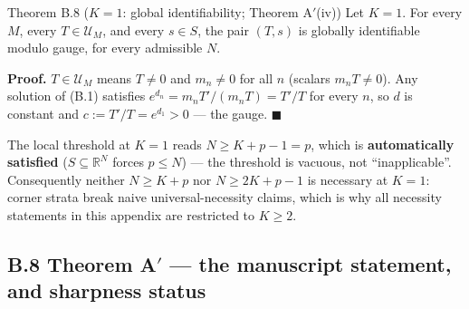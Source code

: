 \begin{namedthm}{Theorem B.8 ($K=1$: global identifiability; Theorem A$'$(iv))}
Let $K=1$. For every $M$, every $T\in\mathcal U_M$, and every $s\in S$, the pair $(T,s)$ is globally identifiable modulo gauge, for every admissible $N$.
\end{namedthm}

\noindent\textbf{Proof.} $T\in\mathcal U_M$ means $T\neq0$ and $m_n\neq0$ for all $n$ (scalars $m_nT\neq0$). Any solution of (B.1) satisfies $e^{d_n}=m_nT'/(m_nT)=T'/T$ for every $n$, so $d$ is constant and $c:=T'/T=e^{d_1}>0$ --- the gauge. \hfill$\blacksquare$

The local threshold at $K=1$ reads $N\ge K+p-1=p$, which is \textbf{automatically satisfied} ($S\subseteq\mathbb R^N$ forces $p\le N$) --- the threshold is vacuous, not ``inapplicable''. Consequently neither $N\ge K+p$ nor $N\ge2K+p-1$ is necessary at $K=1$: corner strata break naive universal-necessity claims, which is why all necessity statements in this appendix are restricted to $K\ge2$.

\subsection{B.8 Theorem A\texorpdfstring{$'$}{'} --- the manuscript statement, and sharpness status}

